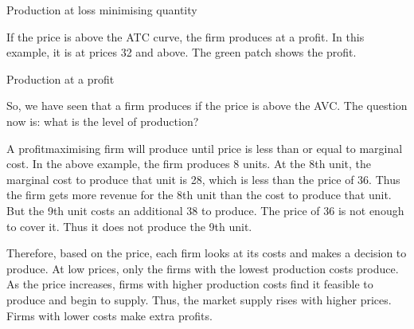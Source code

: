 \documentclass[letterpaper,10pt,english]{jupyterBook}
\begin{document}
\begin{sphinxVerbatim}[commandchars=\\\{\}]
 
\end{sphinxVerbatim}

\begin{sphinxVerbatim}[commandchars=\\\{\}]
Production at loss minimising quantity
\end{sphinxVerbatim}

\noindent{}

\sphinxAtStartPar
If the price is above the ATC curve, the firm produces at a profit. In this example, it is at prices 32 and above. The green patch shows the profit.

\begin{sphinxVerbatim}[commandchars=\\\{\}]
 
\end{sphinxVerbatim}

\begin{sphinxVerbatim}[commandchars=\\\{\}]
Production at a profit
\end{sphinxVerbatim}

\noindent{}

\sphinxAtStartPar
So, we have seen that a firm produces if the price is above the AVC. The question now is: what is the level of production?

\sphinxAtStartPar
A profit\sphinxhyphen{}maximising firm will produce until price is less than or equal to marginal cost. In the above example, the firm produces 8 units. At the 8th unit, the marginal cost to produce that unit is 28, which is less than the price of 36. Thus the firm gets more revenue for the 8th unit than the cost to produce that unit. But the 9th unit costs an additional 38 to produce. The price of 36 is not enough to cover it. Thus it does not produce the 9th unit.

\sphinxAtStartPar
Therefore, based on the price, each firm looks at its costs and makes a decision to produce. At low prices, only the firms with the lowest production costs produce. As the price increases, firms with higher production costs find it feasible to produce and begin to supply. Thus, the market supply rises with higher prices. Firms with lower costs make extra profits.
\end{document}
